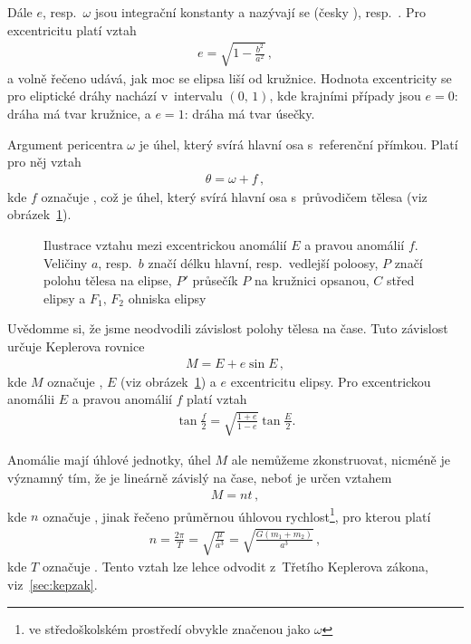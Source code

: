 \documentclass[A4paper, 12pt, oneside]{book}
\begin{document}
Dále $e$, resp.\ $\omega$ jsou integrační konstanty a nazývají se  (česky ), resp.\ . Pro excentricitu platí vztah
\begin{align}
	e=\sqrt{1-\frac{b^2}{a^2}}\,,
\end{align}
a volně řečeno udává, jak moc se elipsa liší od kružnice. Hodnota excentricity se pro eliptické dráhy nachází v~intervalu $(0,\,1)$, kde krajními případy jsou $e=0$: dráha má tvar kružnice, a $e=1$: dráha má tvar úsečky.

Argument pericentra $\omega$ je úhel, který svírá hlavní osa s~referenční přímkou. Platí pro něj vztah
\begin{align}
	\theta=\omega+f\,,
\end{align}
kde $f$ označuje , což je úhel, který svírá hlavní osa s~průvodičem tělesa (viz obrázek~\ref{fig:E}).

\begin{figure}[!htb] 
	\centering
	\caption{Ilustrace vztahu mezi excentrickou anomálií $E$ a pravou anomálií $f$. Veličiny $a$, resp.\ $b$ značí délku hlavní, resp.\ vedlejší poloosy, $P$ značí polohu tělesa na elipse, $P'$ průsečík $P$ na kružnici opsanou, $C$ střed elipsy a $F_1,\,F_2$ ohniska elipsy} \label{fig:E}
\end{figure}

Uvědomme si, že jsme neodvodili závislost polohy tělesa na čase. Tuto závislost určuje Keplerova rovnice
\begin{align} \label{eq:kepler}
M = E + e\sin E\,,
\end{align}
kde $M$ označuje , $E$  (viz obrázek~\ref{fig:E}) a $e$ excentricitu elipsy. Pro excentrickou anomálii $E$ a pravou anomálií $f$ platí vztah
\begin{align} \label {eq:fE}
	\tan \frac{f}{2} = \sqrt{\frac{1+e}{1-e}}\tan \frac{E}{2}.
\end{align}

Anomálie mají úhlové jednotky, úhel $M$ ale nemůžeme zkonstruovat, nicméně je významný tím, že je lineárně závislý na čase, neboť je určen vztahem 
\begin{align} \label{eq:M}
	M=nt\,,
\end{align}
kde $n$ označuje , jinak řečeno průměrnou úhlovou rychlost\footnote{ve středoškolském prostředí obvykle značenou jako $\omega$}, pro kterou platí
\begin{align} \label{eq:n}
	n=\frac{2\pi}{T}=\sqrt{\frac{\mu}{a^3}}=\sqrt{\frac{G(m_1+m_2)}{a^3}}\,,
\end{align}
kde $T$ označuje . Tento vztah lze lehce odvodit z~Třetího Keplerova zákona, viz~\ref{sec:kepzak}.
\end{document}
